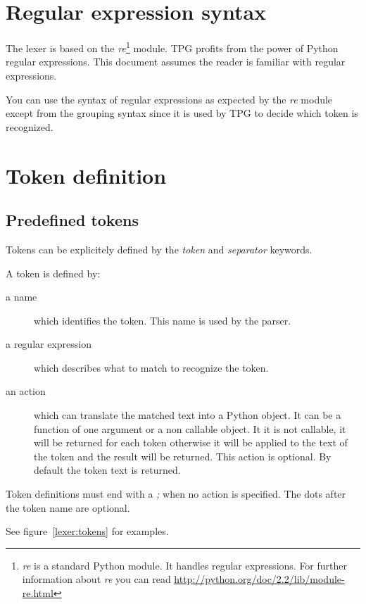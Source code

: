 \section{Regular expression syntax}

The lexer is based on the \emph{re}\footnote{\emph{re} is a standard Python module. It handles regular expressions. For further information about \emph{re} you can read \url{http://python.org/doc/2.2/lib/module-re.html}} module.
TPG profits from the power of Python regular expressions.
This document assumes the reader is familiar with regular expressions.

You can use the syntax of regular expressions as expected by the \emph{re} module except from the grouping syntax since it is used by TPG to decide which token is recognized.

\section{Token definition}                                  \label{lexer:token_def}

\subsection{Predefined tokens}

Tokens can be explicitely defined by the \emph{token} and \emph{separator} keywords.

A token is defined by:

\begin{description}
    \item [a name] which identifies the token.
        This name is used by the parser.
    \item [a regular expression] which describes what to match to recognize the token.
    \item [an action] which can translate the matched text into a Python object. It can be a function of one argument or a non callable object. It it is not callable, it will be returned for each token otherwise it will be applied to the text of the token and the result will be returned. This action is optional. By default the token text is returned.
\end{description}

Token definitions must end with a \emph{;} when no action is specified. The dots after the token name are optional.

See figure~\ref{lexer:tokens} for examples.

